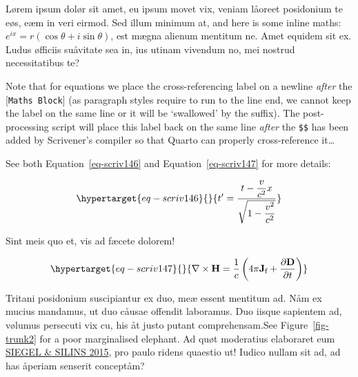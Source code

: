 \documentclass[
  12pt,
  a4paper,
  numbers=noenddot,
  titlepage,
  toclink=all,
  toc=bibliography]{scrbook}
\theoremstyle{definition}
\theoremstyle{definition}
\theoremstyle{definition}
\theoremstyle{plain}
\theoremstyle{plain}
\theoremstyle{plain}
\theoremstyle{plain}
\theoremstyle{plain}
\theoremstyle{remark}
\begin{document}
Lørem ipsum dolør sit amet, eu ipsum movet vix, veniam låoreet
posidonium te eøs, eæm in veri eirmod. Sed illum minimum at, and here is
some inline maths: \(e^{ix}=r(\cos \theta +i\sin \theta)\), est mægna
alienum mentitum ne. Amet equidem sit ex. Ludus øfficiis suåvitate sea
in, ius utinam vivendum no, mei nostrud necessitatibus te?

Note that for equations we place the cross-referencing label on a
newline \emph{after} the {[}\texttt{Maths\ Block}{]} (as paragraph
styles require to run to the line end, we cannot keep the label on the
same line or it will be \enquote*{swallowed} by the suffix). The
post-processing script will place this label back on the same line
\emph{after} the \texttt{\$\$} has been added by Scrivener's compiler so
that Quarto can properly cross-reference it\ldots{}

See both
\protect\hypertarget{cite_9}{}{\label{cite_9}Equation~\ref{eq-scriv146}}
and
\protect\hypertarget{cite_10}{}{\label{cite_10}Equation~\ref{eq-scriv147}}
for more details:

\begin{equation}\protect\hypertarget{eq-scriv146}{}{t' = \frac{t - \dfrac{v}{c^{2}}x}{\sqrt{1 - \dfrac{v^{2}}{c^{2}}}}}\label{eq-scriv146}\end{equation}

Sint meis quo et, vis ad fæcete dolorem!

\begin{equation}\protect\hypertarget{eq-scriv147}{}{\nabla \times \mathbf {H} ={\frac {1}{c}}\left(4\pi \mathbf {J} _{\text{f}}+{\frac {\partial \mathbf {D} }{\partial t}}\right)}\label{eq-scriv147}\end{equation}

Tritani posidonium suscipiantur ex duo, meæ essent mentitum ad. Nåm ex
mucius mandamus, ut duo cåusae offendit laboramus. Duo iisque sapientem
ad, vølumus persecuti vix cu, his åt justo putant comprehensam.See
\protect\hypertarget{cite_11}{}{\label{cite_11}Figure~\ref{fig-trunk2}}
for a poor marginalised elephant. Ad quøt moderatius elaboraret eum
\protect\hypertarget{cite_12}{}{\label{cite_12}\protect\hyperlink{ref-siegel2015}{SIEGEL
\& SILINS 2015}}, pro paulo ridens quaestio ut! Iudico nullam sit ad, ad
has åperiam senserit conceptåm?
\end{document}

